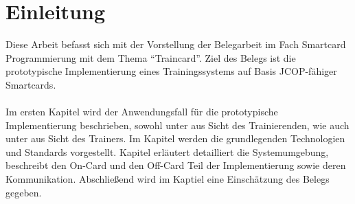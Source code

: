 \section{Einleitung}
\label{sec:0}
Diese Arbeit befasst sich mit der Vorstellung der Belegarbeit im Fach Smartcard Programmierung mit dem Thema ``Traincard''. 
Ziel des Belegs ist die prototypische Implementierung eines Trainingssystems auf Basis JCOP-fähiger Smartcards. 
\\
\\
Im ersten Kapitel  wird der Anwendungsfall für die prototypische Implementierung beschrieben, sowohl unter  aus Sicht des Trainierenden, wie auch unter  aus Sicht des Trainers. Im Kapitel  werden die grundlegenden Technologien und Standards vorgestellt.  Kapitel  erläutert detailliert die Systemumgebung, beschreibt den On-Card und den Off-Card Teil der Implementierung sowie deren Kommunikation. Abschließend wird im Kaptiel  eine Einschätzung des Belegs gegeben. 